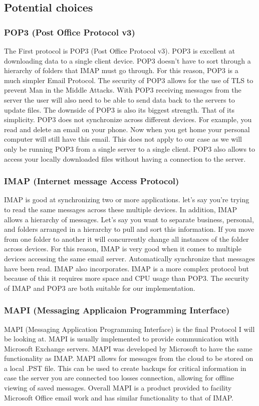 \documentclass[onecolumn, draftclsnofoot,10pt, compsoc]{IEEEtran}
\begin{document}
\subsection{ Potential choices }
\subsubsection{ POP3 (Post Office Protocol v3) }
The First protocol is POP3 (Post Office Protocol v3). POP3 is excellent at downloading data to a single client device. POP3 doesn’t have to sort through a hierarchy of folders that IMAP must go through. For this reason, POP3 is a much simpler Email Protocol. The security of POP3 allows for the use of TLS to prevent Man in the Middle Attacks. With POP3 receiving messages from the server the user will also need to be able to send data back to the servers to update files. The downside of POP3 is also its biggest strength. That of its simplicity. POP3 does not synchronize across different devices. For example, you read and delete an email on your phone. Now when you get home your personal computer will still have this email. This does not apply to our case as we will only be running POP3 from a single server to a single client. POP3 also allows to access your locally downloaded files without having a connection to the server.
\subsubsection{ IMAP (Internet message Access Protocol) }
IMAP is good at synchronizing two or more applications. let’s say you’re trying to read the same messages across these multiple devices. In addition, IMAP allows a hierarchy of messages. Let’s say you want to separate business, personal, and folders arranged in a hierarchy to pull and sort this information.  If you move from one folder to another it will concurrently change all instances of the folder across devices. For this reason, IMAP is very good when it comes to multiple devices accessing the same email server. Automatically synchronize that messages have been read. IMAP also incorporates. IMAP is a more complex protocol but because of this it requires more space and CPU usage than POP3. The security of IMAP and POP3 are both suitable for our implementation.
\subsubsection{ MAPI (Messaging Applicaion Programming Interface) }
MAPI (Messaging Application Programming Interface) is the final Protocol I will be looking at. MAPI is usually implemented to provide communication with Microsoft Exchange servers. MAPI was developed by Microsoft to have the same functionality as IMAP. MAPI allows for messages from the cloud to be stored on a local .PST file. This can be used to create backups for critical information in case the server you are connected too losses connection, allowing for offline viewing of saved messages. Overall MAPI is a product provided to facility Microsoft Office email work and has similar functionality to that of IMAP.
\end{document}
